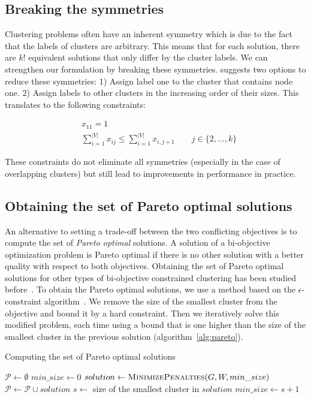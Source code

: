 \documentclass[conference]{IEEEtran}
\begin{document}
\subsection{Breaking the symmetries}
Clustering problems often have an inherent symmetry which is due to the fact that the labels of clusters are arbitrary. This means that for each solution, there are $k!$ equivalent solutions that only differ by the cluster labels. We can strengthen our formulation by breaking these symmetries. \cite{SheraliD05a} suggests two options to reduce these symmetries: 1) Assign label one to the cluster that contains node one. 2) Assign labels to other clusters in the increasing order of their sizes. This translates to the following constraints:

\begin{align}
&x_{11} = 1 \\
&\sum_{i=1}^{|V|} x_{ij} \leq \sum_{i=1}^{|V|} x_{i,j+1} \qquad j \in \{2, \ldots, k\}
\end{align}

These constraints do not eliminate all symmetries (especially in the case of overlapping clusters) but still lead to improvements in performance in practice. 

\subsection{Obtaining the set of Pareto optimal solutions}
An alternative to setting a trade-off between the two conflicting objectives is to compute the set of \emph{Pareto optimal} solutions. A solution of a bi-objective optimization problem is Pareto optimal if there is no other solution with a better quality with respect to both objectives. Obtaining the set of Pareto optimal solutions for other types of bi-objective constrained clustering has been studied before~\cite{GunsDVD16}. To obtain the Pareto optimal solutions, we use a method based on the $\epsilon$-constraint algorithm~\cite{DBLP0015143}. We remove the size of the smallest cluster from the objective and bound it by a hard constraint. Then we iteratively solve this modified problem, each time using a bound that is one higher than the size of the smallest cluster in the previous solution (algorithm~\ref{alg:pareto}).

\begin{algorithm}
\centering
\caption{Computing the set of Pareto optimal solutions}
\label{alg:pareto}
\begin{algorithmic}[1]
\State $\mathcal{P} \gets \emptyset$ 
\State $min\_size \gets 0$
\Repeat
	\State $solution \gets \textsc{MinimizePenalties}(G, W, min\_size)$
	\State $\mathcal{P} \gets \mathcal{P} \cup solution$
	\State $s \gets$ size of the smallest cluster in $solution$
	\State $min\_size \gets s+1$
\end{algorithmic}
\end{algorithm}
\end{document}
